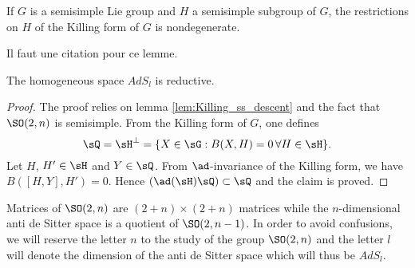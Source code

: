\begin{lemma}		\label{lem:Killing_ss_descent}
If $G$ is a semisimple Lie group and $H$ a semisimple subgroup of $G$, the restrictions on $H$ of the Killing form of $G$ is nondegenerate.
\end{lemma}
\begin{probleme}
Il faut une citation pour ce lemme.
\label{ProbCitLemDesc}
\end{probleme}


\begin{proposition}
The homogeneous space $AdS_l$ is reductive.
\label{PropAdSreduct}
\end{proposition}

\begin{proof}
The proof relies on lemma \ref{lem:Killing_ss_descent} and the fact that $\SO(2,n)$ is semisimple. From the Killing form of $G$, one defines
\[
   \sQ=\sH^{\perp}=\{X\in\sG:B(X,H)=0\,\forall H\in\sH\}.
\]
Let $H$, $H'\in\sH$ and $Y\in\sQ$. From $\ad$-invariance of the Killing form, we have $B([H,Y],H')=0$. Hence $(\ad(\sH)\sQ)\subset \sQ$ and the claim is proved.

\end{proof}

Matrices of $\SO(2,n)$ are $(2+n)\times(2+n)$ matrices while the $n$-dimensional anti de Sitter space is a quotient of $\SO(2,n-1)$. In order to avoid confusions, we will reserve the letter $n$ to the study of the group $\SO(2,n)$ and the letter $l$ will denote the dimension of the anti de Sitter space which will thus be $AdS_l$.

